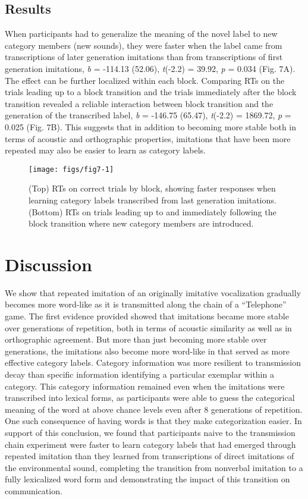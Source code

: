 \documentclass[10pt,letterpaper]{article}
\begin{document}
\subsection{Results}\label{results-4}

When participants had to generalize the meaning of the novel label to
new category members (new sounds), they were faster when the label came
from transcriptions of later generation imitations than from
transcriptions of first generation imitations, \emph{b} = -114.13
(52.06), \emph{t}(-2.2) = 39.92, \emph{p} = 0.034 (Fig. 7A). The effect
can be further localized within each block. Comparing RTs on the trials
leading up to a block transition and the trials immediately after the
block transition revealed a reliable interaction between block
transition and the generation of the transcribed label, \emph{b} =
-146.75 (65.47), \emph{t}(-2.2) = 1869.72, \emph{p} = 0.025 (Fig. 7B).
This suggests that in addition to becoming more stable both in terms of
acoustic and orthographic properties, imitations that have been more
repeated may also be easier to learn as category labels.

\begin{figure}
\texttt{[image: figs/fig7-1]} \caption{(Top) RTs on correct trials by block, showing faster responses when learning category labels transcribed from last generation imitations. (Bottom) RTs on trials leading up to and immediately following the block transition where new category members are introduced.}\label{fig:fig7}
\end{figure}

\section{Discussion}\label{discussion}

We show that repeated imitation of an originally imitative vocalization
gradually becomes more word-like as it is transmitted along the chain of
a ``Telephone'' game. The first evidence provided showed that imitations
became more stable over generations of repetition, both in terms of
acoustic similarity as well as in orthographic agreement. But more than
just becoming more stable over generations, the imitations also become
more word-like in that served as more effective category labels.
Category information was more resilient to transmission decay than
specific information identifying a particular exemplar within a
category. This category information remained even when the imitations
were transcribed into lexical forms, as participants were able to guess
the categorical meaning of the word at above chance levels even after 8
generations of repetition. One such consequence of having words is that
they make categorization easier. In support of this conclusion, we found
that participants naive to the transmission chain experiment were faster
to learn category labels that had emerged through repeated imitation
than they learned from transcriptions of direct imitations of the
environmental sound, completing the transition from nonverbal imitation
to a fully lexicalized word form and demonstrating the impact of this
transition on communication.
\end{document}
